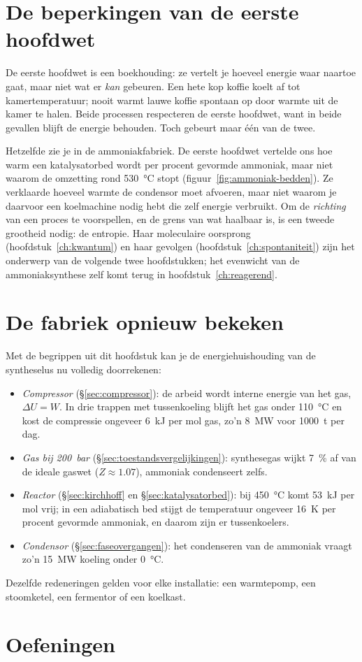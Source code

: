 \section{De beperkingen van de eerste hoofdwet}

De eerste hoofdwet is een boekhouding: ze vertelt je hoeveel energie waar naartoe gaat, maar niet wat er \emph{kan} gebeuren. Een hete kop koffie koelt af tot kamertemperatuur; nooit warmt lauwe koffie spontaan op door warmte uit de kamer te halen. Beide processen respecteren de eerste hoofdwet, want in beide gevallen blijft de energie behouden. Toch gebeurt maar \'e\'en van de twee.

Hetzelfde zie je in de ammoniakfabriek. De eerste hoofdwet vertelde ons hoe warm een katalysatorbed wordt per procent gevormde ammoniak, maar niet waarom de omzetting rond \SI{530}{\celsius} stopt (figuur~\ref{fig:ammoniak-bedden}). Ze verklaarde hoeveel warmte de condensor moet afvoeren, maar niet waarom je daarvoor een koelmachine nodig hebt die zelf energie verbruikt. Om de \emph{richting} van een proces te voorspellen, en de grens van wat haalbaar is, is een tweede grootheid nodig: de entropie. Haar moleculaire oorsprong (hoofdstuk~\ref{ch:kwantum}) en haar gevolgen (hoofdstuk~\ref{ch:spontaniteit}) zijn het onderwerp van de volgende twee hoofdstukken; het evenwicht van de ammoniaksynthese zelf komt terug in hoofdstuk~\ref{ch:reagerend}.

\section{De fabriek opnieuw bekeken}

Met de begrippen uit dit hoofdstuk kan je de energiehuishouding van de syntheselus nu volledig doorrekenen:
\begin{itemize}
\item \emph{Compressor} (\S\ref{sec:compressor}): de arbeid wordt interne energie van het gas, $\Delta U = W$. In drie trappen met tussenkoeling blijft het gas onder \SI{110}{\celsius} en kost de compressie ongeveer \SI{6}{\kilo\joule} per mol gas, zo'n \SI{8}{\mega\watt} voor \SI{1000}{\tonne}  per dag.
\item \emph{Gas bij \SI{200}{\bar}} (\S\ref{sec:toestandsvergelijkingen}): synthesegas wijkt \SI{7}{\percent} af van de ideale gaswet ($Z \approx 1.07$), ammoniak condenseert zelfs.
\item \emph{Reactor} (\S\ref{sec:kirchhoff} en \S\ref{sec:katalysatorbed}): bij \SI{450}{\celsius} komt \SI{53}{\kilo\joule} per mol  vrij; in een adiabatisch bed stijgt de temperatuur ongeveer \SI{16}{\kelvin} per procent gevormde ammoniak, en daarom zijn er tussenkoelers.
\item \emph{Condensor} (\S\ref{sec:faseovergangen}): het condenseren van de ammoniak vraagt zo'n \SI{15}{\mega\watt} koeling onder \SI{0}{\celsius}.
\end{itemize}
Dezelfde redeneringen gelden voor elke installatie: een warmtepomp, een stoomketel, een fermentor of een koelkast.

\section{Oefeningen}


